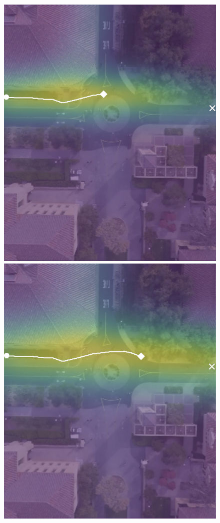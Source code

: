 \documentclass[letterpaper,10pt,conference]{ieeeconf}
\begin{document}
\begin{figure}
\begin{minipage}[t]{0.3\linewidth}
	\includegraphics[width=\linewidth]{./figures/comparison/ours_death_1_2_t=250.png}
\end{minipage}
\begin{minipage}[t]{0.3\linewidth}
	\includegraphics[width=\linewidth]{./figures/comparison/ours_death_1_2_t=370.png}
\end{minipage}


\end{figure}
\end{document}
